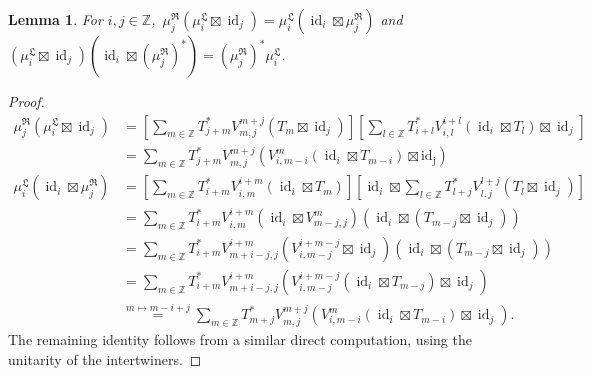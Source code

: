 \documentclass{article}
\newtheorem{lemma}{Lemma}
\newcommand{\Z}{\mathbb{Z}}
\begin{document}
\begin{lemma}{\label{adjointly}}
    For $i, j \in \Z$,\ 
    $\mu_j^{\mathfrak{R}}(\mu_i^{\mathfrak{L}}\boxtimes \operatorname{id}_j) = \mu_i^{\mathfrak{L}}(\operatorname{id}_i\boxtimes\mu_j^{\mathfrak{R}}) $
    and 
    $(\mu_i^{\mathfrak{L}}\boxtimes \operatorname{id}_j)(\operatorname{id}_i\boxtimes (\mu_j^{\mathfrak{R}})^*) = (\mu_j^{\mathfrak{R}})^* \mu_i^{\mathfrak{L}}$.
\end{lemma}
\begin{proof}
    
 \begin{align*}
     \mu_j^{\mathfrak{R}}(\mu_i^{\mathfrak{L}}\boxtimes \operatorname{id}_j) &= [\sum_{m\in\Z}T^*_{j+m}V^{m+j}_{m,j}(T_m\boxtimes \operatorname{id}_j) ]
                                                      [\sum_{l\in\Z}T^*_{i+l}V^{i+l}_{i,l}(\operatorname{id}_i\boxtimes T_l)\boxtimes \operatorname{id}_j ]\\
                                                   & = \sum_{m\in\Z} T^*_{j+m}V^{m+j}_{m,j}(V^m_{i,m-i}(\operatorname{id}_i\boxtimes T_{m-i})\boxtimes\operatorname{id_j})\\
     \mu_i^{\mathfrak{L}}(\operatorname{id}_i\boxtimes\mu_j^{\mathfrak{R}})  &= [\sum_{m\in\Z}T^*_{i+m}V^{i+m}_{i,m}(\operatorname{id}_i \boxtimes T_m)]
                                                      [\operatorname{id}_i \boxtimes \sum_{l\in\Z} T_{l+j}^* V^{l+j}_{l,j}(T_l\boxtimes \operatorname{id}_j)] \\
                                                   &= \sum_{m\in\Z}T^*_{i+m} V^{i+m}_{i,m}(\operatorname{id}_i\boxtimes V^m_{m-j,j})(\operatorname{id}_i \boxtimes (T_{m-j}\boxtimes \operatorname{id}_j))\\
                                                   &= \sum_{m\in\Z} T^*_{i+m} V^{i+m}_{m+i-j, j}(V^{i+m-j}_{i, m-j}\boxtimes \operatorname{id}_j)(\operatorname{id}_i\boxtimes (T_{m-j}\boxtimes \operatorname{id}_j))\\
                                                   &= \sum_{m\in\Z} T^*_{i+m} V^{i+m}_{m+i-j, j}(V^{i+m-j}_{i, m-j}(\operatorname{id}_i\boxtimes T_{m-j})\boxtimes \operatorname{id}_j)\\
                                                   &\overset{m \mapsto m-i+j}{=} \sum_{m\in\Z} T^*_{m+j}V^{m+j}_{m,j}(V_{i,m-i}^m(\operatorname{id}_i\boxtimes T_{m-i})\boxtimes \operatorname{id}_j).
 \end{align*}
The remaining identity follows from a similar direct computation, using the unitarity of the intertwiners.
 \end{proof}
\end{document}
